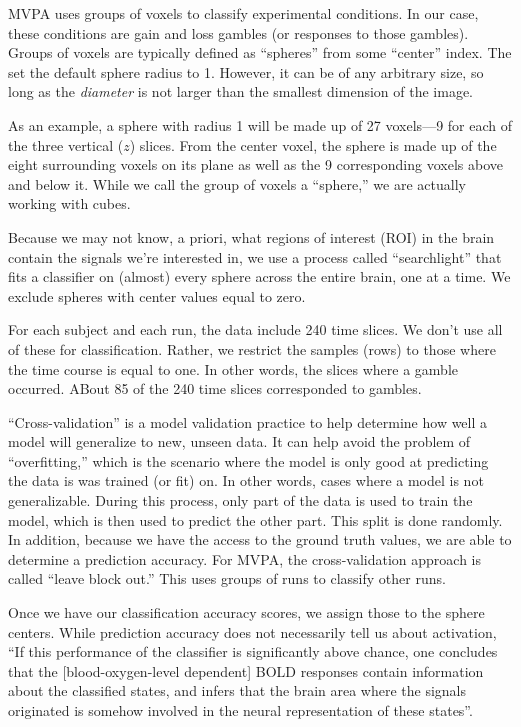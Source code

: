 \documentclass[11pt]{article}
\begin{document}
MVPA uses groups of voxels to classify experimental conditions. In our case,
these conditions are gain and loss gambles (or responses to those gambles).
Groups of voxels are typically defined as ``spheres'' from some ``center''
index. The set the default sphere radius to 1. However, it can be of any
arbitrary size, so long as the \textit{diameter} is not larger than the
smallest dimension of the image.

As an example, a sphere with radius 1 will be made up of 27 voxels---9
for each of the three vertical (\(z\)) slices. From the center voxel, the
sphere is made up of the eight surrounding voxels on its plane as well as the
9 corresponding voxels above and below it. While we call the group of voxels a
``sphere,'' we are actually working with cubes.

Because we may not know, a priori, what regions of interest (ROI) in the brain
contain the signals we're interested in, we use a process called
``searchlight'' that fits a classifier on (almost) every sphere across the
entire brain, one at a time. We exclude spheres with center values equal to
zero.

For each subject and each run, the data include 240 time slices. We don't use
all of these for classification. Rather, we restrict the samples (rows) to
those where the time course is equal to one. In other words, the slices where a
gamble occurred. ABout 85 of the 240 time slices corresponded to gambles.

``Cross-validation'' is a model validation practice to help determine how well
a model will generalize to new, unseen data. It can help avoid the problem of
``overfitting,'' which is the scenario where the model is only good at
predicting the data is was trained (or fit) on. In other words, cases where a
model is not generalizable. During this process, only part of the data is used
to train the model, which is then used to predict the other part. This split is
done randomly. In addition, because we have the access to the ground truth
values, we are able to determine a prediction accuracy. For MVPA, the
cross-validation approach is called ``leave block out.'' This uses groups of
runs to classify other runs.

Once we have our classification accuracy scores, we assign those to the sphere
centers. While prediction accuracy does not necessarily tell us about
activation, ``If this performance of the classifier is significantly above
chance, one concludes that the [blood-oxygen-level dependent] BOLD responses
contain information about the classified states, and infers that the brain area
where the signals originated is somehow involved in the neural representation
of these states''\cite{schreiber2013statistical}.
\end{document}
